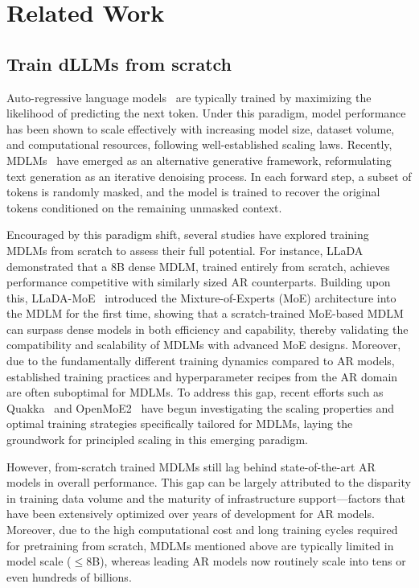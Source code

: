 \section{Related Work}
\subsection{Train dLLMs from scratch}
Auto-regressive language models~\citep{lingv2,moonshot2025kimik2,liu2024deepseekv3,meta2025llama4} are typically trained by maximizing the likelihood of predicting the next token. Under this paradigm, model performance has been shown to scale effectively with increasing model size, dataset volume, and computational resources, following well-established scaling laws. Recently, MDLMs~\citep{song2025seed,Dream7B2025,nie2025llada} have emerged as an alternative generative framework, reformulating text generation as an iterative denoising process. In each forward step, a subset of tokens is randomly masked, and the model is trained to recover the original tokens conditioned on the remaining unmasked context. %

Encouraged by this paradigm shift, several studies have explored training MDLMs from scratch to assess their full potential. For instance, LLaDA~\citep{nie2025llada} demonstrated that a 8B dense MDLM, trained entirely from scratch, achieves performance competitive with similarly sized AR counterparts. Building upon this, LLaDA-MoE~\citep{zhu2025lladamoe} introduced the Mixture-of-Experts (MoE) architecture into the MDLM for the first time, showing that a scratch-trained MoE-based MDLM can surpass dense models in both efficiency and capability, thereby validating the compatibility and scalability of MDLMs with advanced MoE designs. Moreover, due to the fundamentally different training dynamics compared to AR models, established training practices and hyperparameter recipes from the AR domain are often suboptimal for MDLMs. To address this gap, recent efforts such as Quakka~\citep{quakka2025} and OpenMoE2~\citep{openmoe2} have begun investigating the scaling properties and optimal training strategies specifically tailored for MDLMs, laying the groundwork for principled scaling in this emerging paradigm.

However, from-scratch trained MDLMs still lag behind state-of-the-art AR models in overall performance. This gap can be largely attributed to the disparity in training data volume and the maturity of infrastructure support—factors that have been extensively optimized over years of development for AR models. Moreover, due to the high computational cost and long training cycles required for pretraining from scratch, MDLMs mentioned above are typically limited in model scale ($\leq$8B), whereas leading AR models now routinely scale into tens or even hundreds of billions. 

